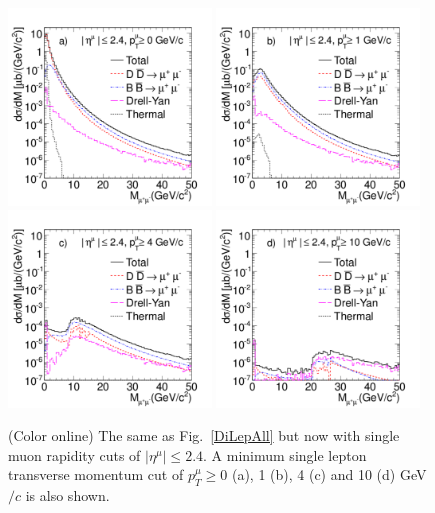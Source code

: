 \begin{figure}
\includegraphics[width=0.48\textwidth]{chap_DiMuonContinuum_figures/Fig7a_Eta24Pt0}
\includegraphics[width=0.48\textwidth]{chap_DiMuonContinuum_figures/Fig7b_Eta24Pt1}
\includegraphics[width=0.48\textwidth]{chap_DiMuonContinuum_figures/Fig7c_Eta24Pt4}
\includegraphics[width=0.48\textwidth]{chap_DiMuonContinuum_figures/Fig7d_Eta24Pt10}
\caption{(Color online) The same as Fig.~\protect\ref{DiLepAll} 
but now with single muon
rapidity cuts of $|\eta^\mu| \leq 2.4$.  A minimum single lepton transverse 
momentum cut of $p_T^\mu \geq 0$ (a), 1 (b), 4 (c) and 10 (d) GeV$/c$ is also 
shown.}
\label{DiLepCMST}
\end{figure}

